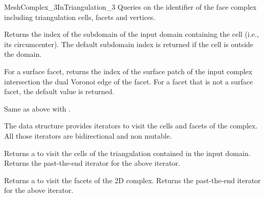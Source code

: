 \begin{ccRefConcept}{MeshComplex_3InTriangulation_3}
Queries on the identifier of the face complex 
including triangulation cells, facets and vertices.

{Returns the index of the subdomain of the input domain containing
  the cell  (i.e., its circumcenter).
The default subdomain index is returned if the cell   is outside the domain.}

{For a surface facet, returns  the index of the surface patch of the input complex
intersection the dual Voronoi edge of the facet.
For a facet that is not a surface facet, the default  value
is returned.} 


{Same as above with .}





The data structure provides iterators to visit the cells and facets of the complex.
All those iterators are bidirectional and non mutable.

{Returns a  to visit the cells of the triangulation contained in the input domain.}
\ccGlue
{}
{Returns the past-the-end iterator for the above iterator.}

{Returns a  to visit the facets
of the 2D complex.}
\ccGlue
{}
{Returns the  past-the-end iterator for the above iterator.}




\ccHasModels
{}


\ccSeeAlso
{} \\






\end{ccRefConcept}

\ccRefPageEnd

